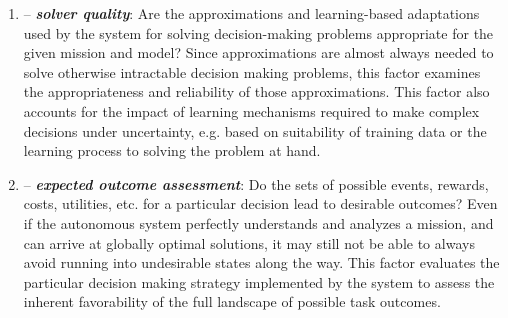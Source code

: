 \begin{enumerate}
%
\item \xQ -- \textit{\textbf{solver quality}}: Are the approximations and learning-based adaptations used by the system for solving decision-making problems appropriate for the given mission and model? 
Since approximations are almost always needed to solve otherwise intractable decision making problems,  this factor examines the appropriateness and reliability of those approximations. 
This factor also accounts for the impact of learning mechanisms required to make complex decisions under uncertainty, e.g. based on suitability of training data or the learning process to solving the problem at hand. 
%
\item \xO-- \textit{\textbf{expected outcome assessment}}: Do the sets of possible events, rewards, costs, utilities, etc. for a particular decision lead to desirable outcomes? 
Even if the autonomous system perfectly understands and analyzes a mission, and can arrive at globally optimal solutions, it may still not be able to always avoid running into undesirable states along the way. %
This factor evaluates the particular decision making strategy implemented by the system to assess the inherent favorability of the full landscape of possible task outcomes.  

\end{enumerate}
